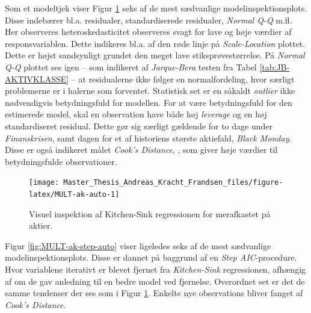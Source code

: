 \documentclass[
  a4paper,
  oneside]{memoir}
\begin{document}
Som et modeltjek viser Figur \ref{fig:MULT-ak-auto} seks af de mest sædvanlige modelinspektionsplots. Disse indebærer bl.a. residualer, standardiserede residualer, \emph{Normal Q-Q} m.fl. Her observeres heteroskedasticitet observeres svagt for lave og høje værdier af responsvariablen. Dette indikeres bl.a. af den røde linje på \emph{Scale-Location} plottet. Dette er højst sandsynligt grundet den meget lave stiksprøvestørrelse. På \emph{Normal Q-Q} plottet ses igen -- som indikeret af \emph{Jarque-Bera} testen fra Tabel \ref{tab:JB-AKTIVKLASSE} -- at residualerne ikke følger en normalfordeling, hvor særligt problemerne er i halerne som forventet. Statistisk set er en såkaldt \emph{outlier} ikke nødvendigvis betydningsfuld for modellen. For at være betydningsfuld for den estimerede model, skal en observation have både høj \emph{leverage} og en høj standardiseret residual. Dette gør sig særligt gældende for to dage under \emph{Finanskrisen}, samt dagen for et af historiens største aktiefald, \emph{Black Monday}. Disse er også indikeret målet \emph{Cook's Distance}, \citep{Cook1977}, som giver høje værdier til betydningsfulde observationer.

\begin{figure}[H]

{\centering \texttt{[image: Master\_Thesis\_Andreas\_Kracht\_Frandsen\_files/figure-latex/MULT-ak-auto-1]} 

}

\caption{Visuel inspektion af Kitchen-Sink regressionen for merafkastet på aktier.}\label{fig:MULT-ak-auto}
\end{figure}

Figur \ref{fig:MULT-ak-step-auto} viser ligeledes seks af de mest sædvanlige modelinspektionsplots. Disse er dannet på baggrund af en \emph{Step AIC}-procedure. Hvor variablene iterativt er blevet fjernet fra \emph{Kitchen-Sink} regressionen, afhængig af om de gav anledning til en bedre model ved fjernelse. Overordnet set er det de samme tendenser der ses som i Figur \ref{fig:MULT-ak-auto}. Enkelte nye observations bliver fanget af \emph{Cook's Distance}.
\end{document}
